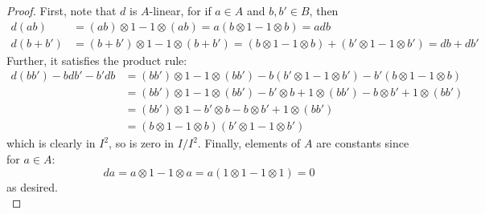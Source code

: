 \begin{proof}
	First, note that $d$ is $A$-linear, for if $a \in A$ and $b,b' \in B$, then
	\begin{align*}
		d(ab) &= (ab) \otimes 1 - 1 \otimes (ab) = a(b \otimes 1 - 1 \otimes b) = adb \\
		d(b+b') &= (b+b') \otimes 1 - 1 \otimes (b+b') = (b \otimes 1 - 1 \otimes b)+(b' \otimes 1 - 1 \otimes b') = db+db'
	\end{align*}
	Further, it satisfies the product rule:
	\begin{align*}
	d(bb')-bdb'-b'db
		&= (bb') \otimes 1 - 1 \otimes (bb') - b(b' \otimes 1 - 1 \otimes b') - b'(b \otimes 1 - 1 \otimes b) \\
		&= (bb') \otimes 1 - 1 \otimes (bb') - b' \otimes b + 1 \otimes (bb') - b \otimes b' + 1 \otimes (bb') \\
		&= (bb') \otimes 1 - b' \otimes b - b \otimes b' + 1 \otimes (bb') \\
		&= (b \otimes 1 - 1 \otimes b)(b' \otimes 1 - 1 \otimes b')
	\end{align*}
	which is clearly in $I^2$, so is zero in $I/I^2$. Finally, elements of $A$ are constants since for $a \in A$:
	\[ da = a \otimes 1 - 1 \otimes a = a(1 \otimes 1 - 1 \otimes 1) = 0 \]
	as desired. \\
	

\end{proof}
